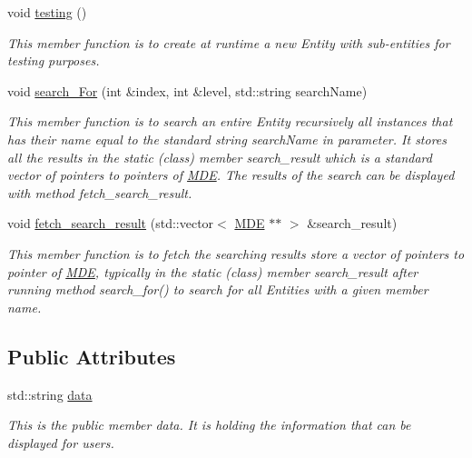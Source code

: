 \begin{DoxyCompactItemize}
void \hyperlink{group__group__testing_ga06c00f993c0b3069376b762aeb731d9b}{testing} ()
\begin{DoxyCompactList}\small\item\em This member function is to create at runtime a new Entity with sub-\/entities for testing purposes. \end{DoxyCompactList}\item 
void \hyperlink{group__group__search_ga265f4aa5242e6380380067d659ada5c1}{search\+\_\+\+For} (int \&index, int \&level, std\+::string search\+Name)
\begin{DoxyCompactList}\small\item\em This member function is to search an entire Entity recursively all instances that has their name equal to the standard string search\+Name in parameter. It stores all the results in the static (class) member search\+\_\+result which is a standard vector of pointers to pointers of \hyperlink{classMDE}{M\+DE}. The results of the search can be displayed with method fetch\+\_\+search\+\_\+result. \end{DoxyCompactList}\item 
void \hyperlink{group__group__search_gaa7a2d3a12f120684e389e8d045b6bf24}{fetch\+\_\+search\+\_\+result} (std\+::vector$<$ \hyperlink{classMDE}{M\+DE} $\ast$$\ast$ $>$ \&search\+\_\+result)
\begin{DoxyCompactList}\small\item\em This member function is to fetch the searching results store a vector of pointers to pointer of \hyperlink{classMDE}{M\+DE}, typically in the static (class) member search\+\_\+result after running method search\+\_\+for() to search for all Entities with a given member \textquotesingle{}name\textquotesingle{}. \end{DoxyCompactList}\end{DoxyCompactItemize}
\subsection*{Public Attributes}
\begin{DoxyCompactItemize}
\item 
std\+::string \hyperlink{classMDE_a4b1eec75c370b8906e7b203bfb231308}{data}
\begin{DoxyCompactList}\small\item\em This is the public member \textquotesingle{}data\textquotesingle{}. It is holding the information that can be displayed for users. \end{DoxyCompactList}\end{DoxyCompactItemize}


